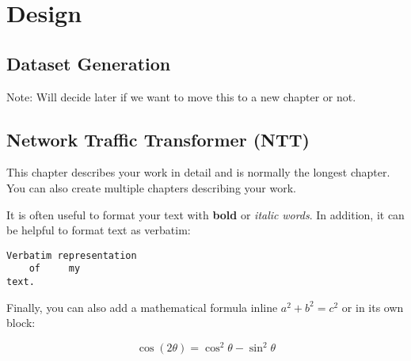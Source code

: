 \chapter{Design}
\label{cha:design}

\section{Dataset Generation}
\label{sec:ns3}

Note: Will decide later if we want to move this to a new chapter or not.

\section{Network Traffic Transformer (NTT)}
\label{sec:ntt}

This chapter describes your work in detail and is normally the longest chapter.
You can also create multiple chapters describing your work.

It is often useful to format your text with \textbf{bold} or \textit{italic}
\emph{words}. In addition, it can be helpful to format text as verbatim:

\begin{verbatim}
Verbatim representation
    of     my
text.
\end{verbatim}

Finally, you can also add a mathematical formula inline $a^2 + b^2 = c^2$ or in
its own block:

\begin{equation}
    \cos (2\theta) = \cos^2 \theta - \sin^2 \theta
\end{equation}

